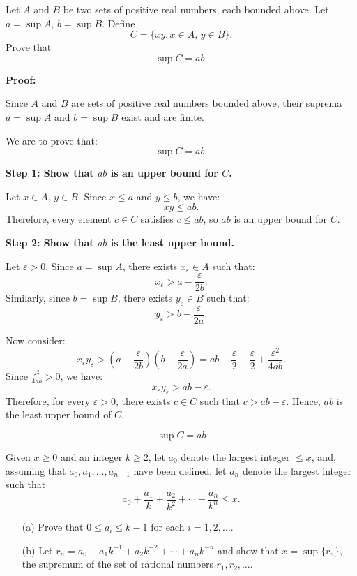 \begin{problembox}
Let \( A \) and \( B \) be two sets of positive real numbers, each bounded above. Let \( a = \sup A \), \( b = \sup B \). Define
\[
C = \{ xy : x \in A,\, y \in B \}.
\]
Prove that
\[
\sup C = ab.
\]
\end{problembox}

\textbf{Proof:}

Since \( A \) and \( B \) are sets of positive real numbers bounded above, their suprema \( a = \sup A \) and \( b = \sup B \) exist and are finite.

We are to prove that:
\[
\sup C = ab.
\]

\textbf{Step 1: Show that \( ab \) is an upper bound for \( C \).}

Let \( x \in A \), \( y \in B \). Since \( x \leq a \) and \( y \leq b \), we have:
\[
xy \leq ab.
\]
Therefore, every element \( c \in C \) satisfies \( c \leq ab \), so \( ab \) is an upper bound for \( C \).

\textbf{Step 2: Show that \( ab \) is the least upper bound.}

Let \( \varepsilon > 0 \). Since \( a = \sup A \), there exists \( x_\varepsilon \in A \) such that:
\[
x_\varepsilon > a - \frac{\varepsilon}{2b}.
\]
Similarly, since \( b = \sup B \), there exists \( y_\varepsilon \in B \) such that:
\[
y_\varepsilon > b - \frac{\varepsilon}{2a}.
\]

Now consider:
\[
x_\varepsilon y_\varepsilon > \left(a - \frac{\varepsilon}{2b}\right)\left(b - \frac{\varepsilon}{2a}\right) = ab - \frac{\varepsilon}{2} - \frac{\varepsilon}{2} + \frac{\varepsilon^2}{4ab}.
\]
Since \( \frac{\varepsilon^2}{4ab} > 0 \), we have:
\[
x_\varepsilon y_\varepsilon > ab - \varepsilon.
\]
Therefore, for every \( \varepsilon > 0 \), there exists \( c \in C \) such that \( c > ab - \varepsilon \). Hence, \( ab \) is the least upper bound of \( C \).

\[
\boxed{\sup C = ab}
\]

\begin{problembox}
    Given \( x \geq 0 \) and an integer \( k \geq 2 \), let \( a_0 \) denote the largest integer \( \leq x \), and, assuming that \( a_0, a_1, \dots, a_{n-1} \) have been defined, let \( a_n \) denote the largest integer such that
    \[
    a_0 + \frac{a_1}{k} + \frac{a_2}{k^2} + \cdots + \frac{a_n}{k^n} \leq x.
    \]
    
    \begin{enumerate}
    \item[(a)] Prove that \( 0 \leq a_i \leq k - 1 \) for each \( i = 1, 2, \dots \).
    \item[(b)] Let \( r_n = a_0 + a_1 k^{-1} + a_2 k^{-2} + \cdots + a_n k^{-n} \) and show that \( x = \sup \{ r_n \} \), the supremum of the set of rational numbers \( r_1, r_2, \dots \).
    \end{enumerate}
    \end{problembox}
    
